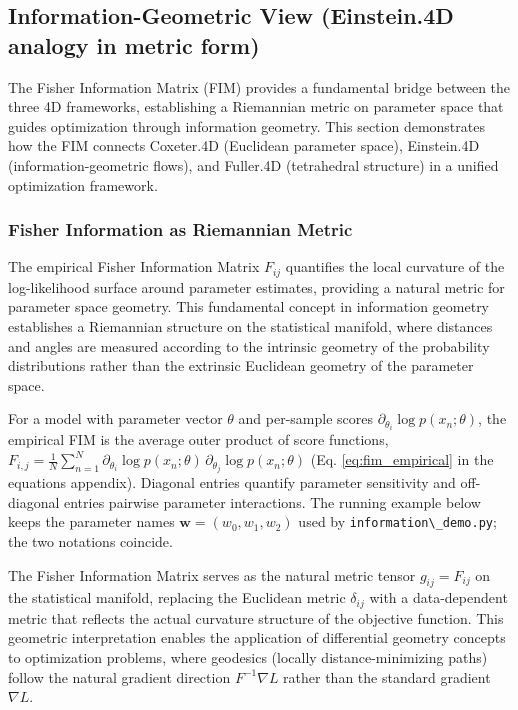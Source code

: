 \documentclass[
  10pt,
]{article}
\newcommand{\passthrough}[1]{#1}
\begin{document}
\subsection{Information-Geometric View (Einstein.4D analogy in metric
form)}\label{information-geometric-view-einstein.4d-analogy-in-metric-form}

The Fisher Information Matrix (FIM) provides a fundamental bridge
between the three 4D frameworks, establishing a Riemannian metric on
parameter space that guides optimization through information geometry.
This section demonstrates how the FIM connects Coxeter.4D (Euclidean
parameter space), Einstein.4D (information-geometric flows), and
Fuller.4D (tetrahedral structure) in a unified optimization framework.

\subsubsection{Fisher Information as Riemannian
Metric}\label{fisher-information-as-riemannian-metric}

The empirical Fisher Information Matrix \(F_{ij}\) quantifies the local
curvature of the log-likelihood surface around parameter estimates,
providing a natural metric for parameter space geometry. This
fundamental concept in information geometry establishes a Riemannian
structure on the statistical manifold, where distances and angles are
measured according to the intrinsic geometry of the probability
distributions rather than the extrinsic Euclidean geometry of the
parameter space.

For a model with parameter vector \(\theta\) and per-sample scores
\(\partial_{\theta_i} \log p(x_n; \theta)\), the empirical FIM is the
average outer product of score functions,
\(F_{i,j} = \frac{1}{N} \sum_{n=1}^{N} \partial_{\theta_i} \log p(x_n; \theta)\, \partial_{\theta_j} \log p(x_n; \theta)\)
(Eq. \eqref{eq:fim_empirical} in the equations appendix). Diagonal
entries quantify parameter sensitivity and off-diagonal entries pairwise
parameter interactions. The running example below keeps the parameter
names \(\mathbf{w} = (w_0, w_1, w_2)\) used by
\passthrough{\lstinline!information\_demo.py!}; the two notations
coincide.

The Fisher Information Matrix serves as the natural metric tensor
\(g_{ij} = F_{ij}\) on the statistical manifold, replacing the Euclidean
metric \(\delta_{ij}\) with a data-dependent metric that reflects the
actual curvature structure of the objective function. This geometric
interpretation enables the application of differential geometry concepts
to optimization problems, where geodesics (locally distance-minimizing
paths) follow the natural gradient direction \(F^{-1}\nabla L\) rather
than the standard gradient \(\nabla L\).
\end{document}
